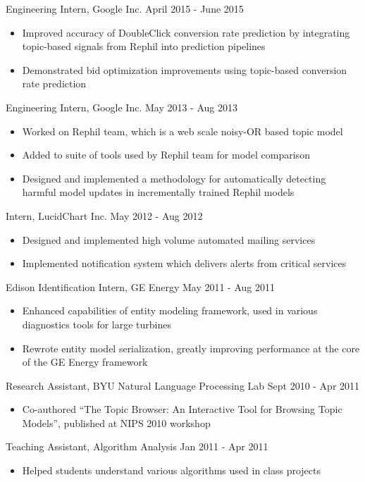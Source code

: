 \documentclass[margin]{res}
\begin{document}
\begin{resume}
Engineering Intern, Google Inc. \hfill April 2015 - June 2015
\begin{itemize} \itemsep -2pt
\item Improved accuracy of DoubleClick conversion rate prediction by
integrating topic-based signals from Rephil into prediction pipelines
\item Demonstrated bid optimization improvements using topic-based conversion
rate prediction
\end{itemize}

Engineering Intern, Google Inc. \hfill May 2013 - Aug 2013
\begin{itemize} \itemsep -2pt
\item Worked on Rephil team, which is a web scale noisy-OR based topic model
\item Added to suite of tools used by Rephil team for model comparison
\item Designed and implemented a methodology for automatically detecting harmful model updates in incrementally trained Rephil models
\end{itemize}

Intern, LucidChart Inc. \hfill May 2012 - Aug 2012
\begin{itemize} \itemsep -2pt
\item Designed and implemented high volume automated mailing services
\item Implemented notification system which delivers alerts from critical services
\end{itemize}

Edison Identification Intern, GE Energy \hfill May 2011 - Aug 2011
\begin{itemize} \itemsep -2pt
\item Enhanced capabilities of entity modeling framework, used in various diagnostics tools for large turbines
\item Rewrote entity model serialization, greatly improving performance at the core of the GE Energy framework
\end{itemize}

Research Assistant, BYU Natural Language Processing Lab \hfill Sept 2010 - Apr
2011
\begin{itemize} \itemsep -2pt
\item Co-authored ``The Topic Browser: An Interactive Tool for Browsing Topic Models'', published at NIPS 2010 workshop
\end{itemize}

Teaching Assistant, Algorithm Analysis \hfill Jan 2011 - Apr 2011
\begin{itemize} \itemsep -2pt
\item Helped students understand various algorithms used in class projects
\end{itemize}


\end{resume}
\end{document}
